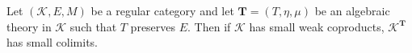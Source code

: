 Let $(\mathcal{K}, E, M)$ be a regular category and let $\mathbf{T} = (T, \eta, \mu)$ be an algebraic theory in $\mathcal{K}$ such that $T$ preserves $E$. Then if $\mathcal{K}$ has small weak coproducts, $\mathcal{K}^{\mathbf{T}}$ has small colimits.
